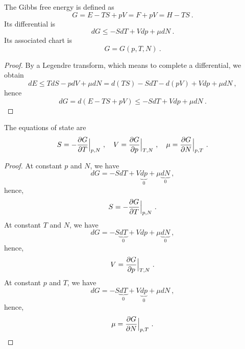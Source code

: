     The Gibbs free energy is defined as 
    \begin{equation*}
        G = E - TS + pV = F + pV = H - TS ~.
    \end{equation*}
    Its differential is 
    \begin{equation} \label{td:d:g}
        dG \leq - SdT + Vdp + \mu dN ~.
    \end{equation}
    Its associated chart is
    \begin{equation*}
        G = G(p, T, N) ~.
    \end{equation*}
    \begin{proof}
        By a Legendre transform, which means to complete a differential, we obtain
        \begin{equation*}
            dE \leq T dS - p dV + \mu dN = d(TS) - S dT - d(pV) + V dp + \mu dN ~,
        \end{equation*}
        hence 
        \begin{equation*}
            dG = d(E - TS + pV) \leq - S dT + Vdp + \mu dN ~.
        \end{equation*}
    \end{proof}
    The equations of state are
    \begin{equation}\label{td:es:g}
        S = - \frac{\partial G}{\partial T} \Big \vert_{p,N} ~, \quad V = \frac{\partial G}{\partial p} \Big \vert_{T,N} ~, \quad \mu = \frac{\partial G}{\partial N} \Big \vert_{p,T} ~. 
    \end{equation}
    \begin{proof}
        At constant $p$ and $N$, we have
        \begin{equation*}
            dG = - S dT + V\underbrace{dp }_0 + \mu \underbrace{dN}_0  ~,
        \end{equation*}
        hence,
        \begin{equation*}
            S = - \frac{\partial G}{\partial T} \Big \vert_{p,N}  ~.
        \end{equation*}
        At constant $T$ and $N$, we have
        \begin{equation*}
            dG = - S \underbrace{dT}_0  + Vdp + \mu \underbrace{dN}_0  ~,
        \end{equation*}
        hence,
        \begin{equation*}
            V = \frac{\partial G}{\partial p} \Big \vert_{T,N} ~.
        \end{equation*}
        At constant $p$ and $T$, we have
        \begin{equation*}
            dG = - S \underbrace{dT}_0  + V\underbrace{dp}_0  + \mu dN ~,
        \end{equation*}
        hence,
        \begin{equation*}
            \mu = \frac{\partial G}{\partial N} \Big \vert_{p,T} ~.
        \end{equation*}
    \end{proof}
